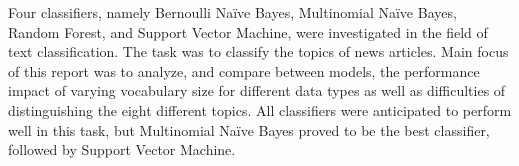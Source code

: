 \noindent Four classifiers, namely Bernoulli Naïve Bayes, Multinomial Naïve Bayes, Random Forest, and Support Vector Machine, were investigated in the field of text classification. The task was to classify the topics of news articles. Main focus of this report was to analyze, and compare between models, the performance impact of varying vocabulary size for different data types as well as difficulties of distinguishing the eight different topics. All classifiers were anticipated to perform well in this task, but Multinomial Naïve Bayes proved to be the best classifier, followed by Support Vector Machine.

